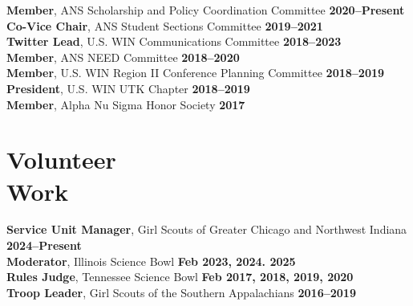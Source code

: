 \documentclass[margin,line]{resume}
\begin{document}
\begin{resume}
        \textbf{Member}, ANS Scholarship and Policy Coordination Committee  \hfill \textbf{2020--Present}\vspace{.5mm}\\%
        \textbf{Co-Vice Chair}, ANS Student Sections Committee \hfill \textbf{2019--2021}\vspace{.5mm}\\%
        \textbf{Twitter Lead}, U.S. WIN Communications Committee  \hfill \textbf{2018--2023}\vspace{.5mm}\\%
        \textbf{Member}, ANS NEED Committee \hfill \textbf{2018--2020}\vspace{.5mm}\\%
        \textbf{Member}, U.S. WIN Region II Conference Planning Committee  \hfill \textbf{2018--2019}\vspace{.5mm}\\%
        \textbf{President}, U.S. WIN UTK Chapter  \hfill \textbf{2018--2019}\vspace{.5mm}\\%
        \textbf{Member}, Alpha Nu Sigma Honor Society \hfill \textbf{2017}\vspace{.5mm}%
    
    \section{\mysidestyle Volunteer\\Work}
        \textbf{Service Unit Manager}, Girl Scouts of Greater Chicago and Northwest Indiana \hfill \textbf{2024--Present}\\
        \textbf{Moderator}, Illinois Science Bowl \hfill\textbf{Feb 2023, 2024. 2025}\\
        \textbf{Rules Judge}, Tennessee Science Bowl \hfill \textbf{Feb 2017, 2018, 2019, 2020}\\
        \textbf{Troop Leader}, Girl Scouts of the Southern Appalachians \hfill \textbf{2016--2019}%
                

\end{resume}
\end{document}
